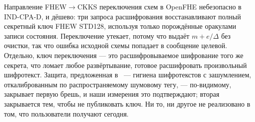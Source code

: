 \documentclass[11pt]{article}
\newcommand{\fto}{\texorpdfstring{FHEW$\to$CKKS}{FHEW-to-CKKS}}
\begin{document}
Направление \fto{} переключения схем в OpenFHE небезопасно в IND-CPA-D, и дёшево: три запроса
расшифрования восстанавливают полный секретный ключ FHEW STD128, используя только порождённые
оракулами записи состояния. Переключение утекает, потому что выдаёт $m + e/\Delta$ без очистки, так
что ошибка исходной схемы попадает в сообщение целевой. Отдельно, ключ переключения ---
это расшифровываемое шифрование того же секрета, что ломает любое развёртывание, готовое расшифровать
произвольный шифротекст. Защита, предложенная в~\cite{santato2026} --- гигиена шифротекстов с
зашумлением, откалиброванным по распространяемому шумовому тегу, --- по-видимому, закрывает первую
брешь, и наши измерения это подтверждают; вторая закрывается тем, чтобы не публиковать ключ. Ни то,
ни другое не реализовано в том, что пользователи получают сегодня.



\end{document}
